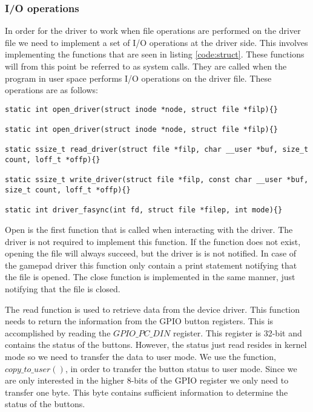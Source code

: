 \subsubsection{I/O operations}
In order for the driver to work when file operations are performed on the driver file we need to implement a set of I/O operations at the driver side. This involves implementing the functions that are seen in listing \ref{code:struct}. These functions will from this point be referred to as system calls. They are called when the program in user space performs I/O operations on the driver file. These operations are as follows: 

\begin{lstlisting}[caption=System calls, label=code:func]
static int open_driver(struct inode *node, struct file *filp){}

static int open_driver(struct inode *node, struct file *filp){}

static ssize_t read_driver(struct file *filp, char __user *buf, size_t count, loff_t *offp){}

static ssize_t write_driver(struct file *filp, const char __user *buf, size_t count, loff_t *offp){}

static int driver_fasync(int fd, struct file *filep, int mode){}
\end{lstlisting}




Open is the first function that is called when interacting with the driver. The driver is not required to implement this function. If the function does not exist, opening the file will always succeed, but the driver is is not notified. In case of the gamepad driver this function only contain a print statement notifying that the file is opened. The close function is implemented in the same manner, just notifying that the file is closed. 

The \emph read function is used to retrieve data from the device driver. This function needs to return the information from the GPIO button registers. This is accomplished by reading the $GPIO\_PC\_DIN$ register. This register is 32-bit and contains the status of the buttons. However, the status just read resides in kernel mode so we need to transfer the data to user mode. We use the function, $copy\_to\_user()$, in order to transfer the button status to user mode. Since we are only interested in the higher 8-bits of the GPIO register we only need to transfer one byte. This byte contains sufficient information to determine the status of the buttons. 

